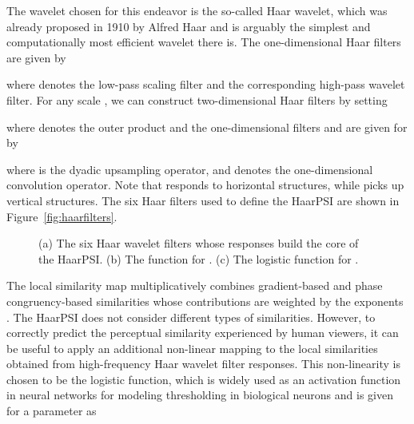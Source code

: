 \documentclass[11pt,a4paper]{article}
\begin{document}
The wavelet chosen for this endeavor is the so-called Haar wavelet, which was already proposed in 1910 by Alfred Haar \cite{Haar1910} and is arguably the simplest and computationally most efficient wavelet there is. The one-dimensional Haar filters are given by

where  denotes the low-pass scaling filter and  the corresponding high-pass wavelet filter.
For any scale , we can construct two-dimensional Haar filters by setting

where  denotes the outer product and the one-dimensional filters  and  are given for  by

where  is the dyadic upsampling operator, and  denotes the one-dimensional convolution operator. Note that  responds to horizontal structures, while   picks up vertical structures. The six Haar filters used to define the HaarPSI are shown in Figure~\ref{fig:haarfilters}.


\setlength{\tabcolsep}{1mm}
\begin{figure}[!htb]
  \hfil
  \hfil
  \caption{(a) The six Haar wavelet filters whose responses build the core of the HaarPSI. (b)  The function  for . (c) The logistic function  for .}
\end{figure}

The local similarity map  multiplicatively combines gradient-based and phase congruency-based similarities whose contributions are weighted by the exponents . The HaarPSI does not consider different types of similarities. However, to correctly predict the perceptual similarity experienced by human viewers, it can be useful to apply an additional non-linear mapping to the local similarities obtained from high-frequency Haar wavelet filter responses. This non-linearity is chosen to be the logistic function, which is widely used as an activation function in neural networks {for modeling thresholding in biological neurons}  and {is} given for a parameter  as
\end{document}
